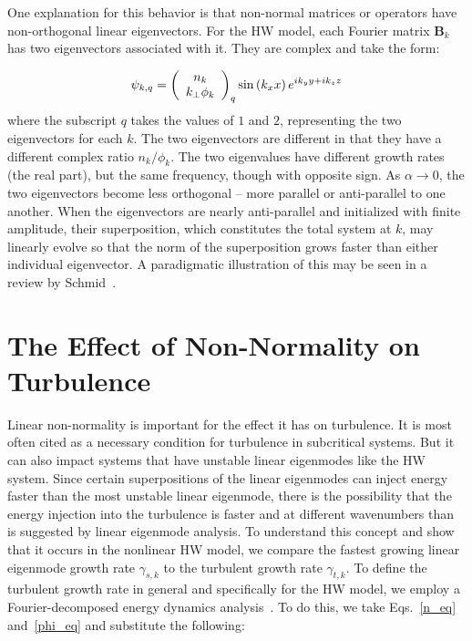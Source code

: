\documentclass[letter,scriptaddress,twocolumn, prl,showkeys]{revtex4}
\def\beq{\begin{equation}}
\def\eeq{\end{equation}}
\begin{document}
One explanation for this behavior is that non-normal matrices or operators have non-orthogonal linear eigenvectors. For the HW model, each Fourier matrix $\mathbf{B}_k$ has two eigenvectors associated
with it. They are complex and take the form:

\beq
\label{lin_eigen_form}
\psi_{k,q} = \left( \begin{array}{cc} n_k \\ k_\perp \phi_k \end{array} \right)_q {\rm sin} \left( k_x x \right) e^{i k_y y + i k_z z} 
\eeq
where the subscript $q$ takes the values of $1$ and $2$, representing the two eigenvectors for each $k$. The two eigenvectors are different in that they have a different complex ratio $n_k/\phi_k$.
The two eigenvalues have different growth rates (the real part), but the same frequency, though with opposite sign.
As $\alpha \to 0$, the two eigenvectors become less orthogonal -- more parallel or anti-parallel to one another. When the eigenvectors are nearly anti-parallel and initialized with finite amplitude,
their superposition, which constitutes the total system at $k$, may linearly evolve so that the norm of the superposition grows faster than either individual eigenvector. A paradigmatic illustration
of this may be seen in a review by Schmid~\cite{schmid2007}.

\section{The Effect of Non-Normality on Turbulence}

Linear non-normality is important for the effect it has on turbulence. It is most often cited as a necessary condition for turbulence in subcritical systems. 
But it can also impact systems that have unstable linear eigenmodes like the HW system. Since certain superpositions of the linear eigenmodes can inject energy faster than the most unstable linear
eigenmode, there is the possibility that the energy injection into the turbulence is faster and at different wavenumbers than is suggested by linear eigenmode analysis. 
To understand this concept and show that it occurs in the nonlinear HW model, we compare the fastest growing linear eigenmode growth rate $\gamma_{s,k}$ to the turbulent growth rate $\gamma_{t,k}$. 
To define the turbulent growth rate in general and specifically for the HW model, we employ a Fourier-decomposed energy dynamics analysis~\cite{camargo1995,friedman2012b,friedman2013}. 
To do this, we take Eqs.~\ref{n_eq} and~\ref{phi_eq} and substitute the following:
\end{document}
